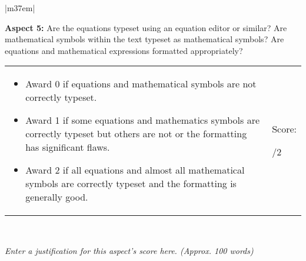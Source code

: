 \documentclass[article,11pt]{book}
\begin{document}
\bigskip


\begin{tabular}{|m{37em}|}
    \hline
    
    \textbf{Aspect 5:} Are the equations typeset using an equation editor or similar? Are mathematical symbols within the text typeset as mathematical symbols? Are equations and mathematical expressions formatted appropriately?  
    \\ \hline
    
    \begin{tabular}{m{32em}|m{5em}}
      \begin{itemize}
          \item Award 0 if equations and mathematical symbols are not correctly typeset.
          \item Award 1 if some equations and mathematics symbols are correctly typeset but others are not or the formatting has significant flaws.
          \item Award 2 if all equations and almost all mathematical symbols are correctly typeset and the formatting is generally good.
      \end{itemize}  
      &  
      Score: 
      
      \medskip
      {\huge  /2}
    \end{tabular} 
    \\ \hline
    
    \textit{Enter a justification for this aspect’s score here. (Approx. 100 words)}
    \\ \hline
\end{tabular}
\end{document}
